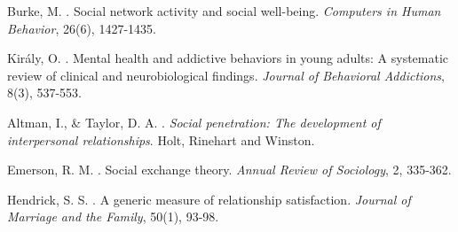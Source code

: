 \documentclass[12pt,a4paper]{article}
\begin{document}

\begin{thebibliography}{99}

Burke, M. . Social network activity and social well-being. \emph{Computers in Human Behavior}, 26(6), 1427-1435.

Király, O. . Mental health and addictive behaviors in young adults: A systematic review of clinical and neurobiological findings. \emph{Journal of Behavioral Addictions}, 8(3), 537-553.

Altman, I., \& Taylor, D. A. . \emph{Social penetration: The development of interpersonal relationships}. Holt, Rinehart and Winston.

Emerson, R. M. . Social exchange theory. \emph{Annual Review of Sociology}, 2, 335-362.

Hendrick, S. S. . A generic measure of relationship satisfaction. \emph{Journal of Marriage and the Family}, 50(1), 93-98.

\end{thebibliography}
\end{document}
